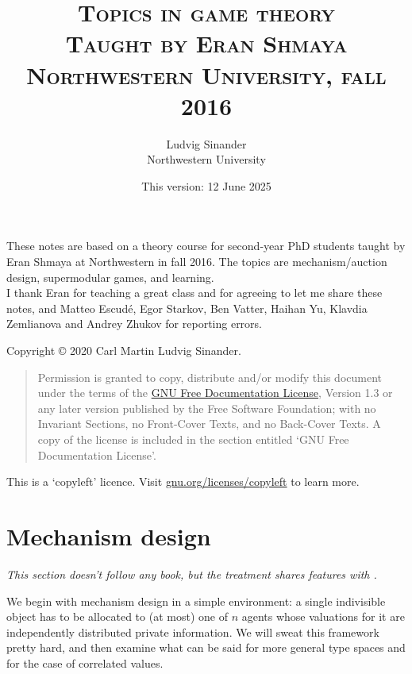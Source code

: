 \documentclass[11pt,letterpaper,reqno,oneside]{article}
\title{\scshape Topics in game theory \\
	\vspace{0.5em}
	\large \scshape Taught by Eran Shmaya \\
	\large \scshape Northwestern University, fall 2016
	}
\author{Ludvig Sinander \\ Northwestern University}
\date{\small This version: 12 June 2025}
\begin{document}
\maketitle


\noindent
These notes are based on a theory course for second-year PhD students taught by Eran Shmaya at Northwestern in fall 2016. The topics are mechanism/auction design, supermodular games, and learning.\\

\noindent
I thank Eran for teaching a great class and for agreeing to let me share these notes, and Matteo Escudé, Egor Starkov, Ben Vatter, Haihan Yu, Klavdia Zemlianova and Andrey Zhukov for reporting errors.



\pagebreak
\hspace{1pt}\vfill
\noindent
Copyright \copyright{} 2020 Carl Martin Ludvig Sinander.

\begin{quotation}
\noindent
Permission is granted to copy, distribute and/or modify this document under the terms of the \href{https://www.gnu.org/licenses/fdl}{GNU Free Documentation License}, Version 1.3 or any later version published by the Free Software Foundation; with no Invariant Sections, no Front-Cover Texts, and no Back-Cover Texts. A copy of the license is included in the section entitled `GNU
Free Documentation License'.
\end{quotation}

\noindent
This is a `copyleft' licence.
Visit \href{https://www.gnu.org/licenses/copyleft}{gnu.org/licenses/copyleft} to learn more.



\pagebreak
{}
\tableofcontents
{}



\pagebreak
\section{Mechanism design}
\label{sec:mech_desi}

\emph{This section doesn't follow any book, but the treatment shares features with \textcite{Vohra2011}.}

We begin with mechanism design in a simple environment: a single indivisible object has to be allocated to (at most) one of $n$ agents whose valuations for it are independently distributed private information. We will sweat this framework pretty hard, and then examine what can be said for more general type spaces and for the case of correlated values.
\end{document}
